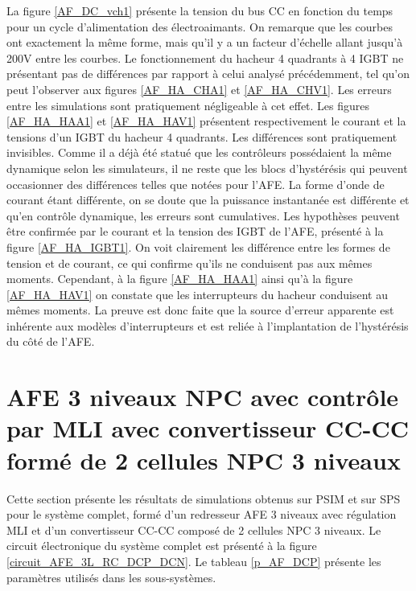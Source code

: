 La figure \ref{AF_DC_vch1} présente la tension du bus CC en fonction du temps pour un cycle d'alimentation des électroaimants. On remarque que les courbes ont exactement la même forme, mais qu'il y a un facteur d'échelle allant jusqu'à 200V entre les courbes. Le fonctionnement du hacheur 4 quadrants à 4 IGBT ne présentant pas de différences par rapport à celui analysé précédemment, tel qu'on peut l'observer aux figures \ref{AF_HA_CHA1} et \ref{AF_HA_CHV1}. Les erreurs entre les simulations sont pratiquement négligeable à cet effet. Les figures \ref{AF_HA_HAA1} et \ref{AF_HA_HAV1} présentent respectivement le courant et la tensions d'un IGBT du hacheur 4 quadrants. Les différences sont pratiquement invisibles. Comme il a déjà été statué que les contrôleurs possédaient la même dynamique selon les simulateurs, il ne reste que les blocs d'hystérésis qui peuvent occasionner des différences telles que notées pour l'AFE. La forme d'onde de courant étant différente, on se doute que la puissance instantanée est différente et qu'en contrôle dynamique, les erreurs sont cumulatives. Les hypothèses peuvent être confirmée par le courant et la tension des IGBT de l'AFE, présenté à la figure \ref{AF_HA_IGBT1}. On voit clairement les différence entre les formes de tension et de courant, ce qui confirme qu'ils ne conduisent pas aux mêmes moments. Cependant, à la figure \ref{AF_HA_HAA1} ainsi qu'à la figure \ref{AF_HA_HAV1} on constate que les interrupteurs du hacheur conduisent au mêmes moments. La preuve est donc faite que la source d'erreur apparente est inhérente aux modèles d'interrupteurs et est reliée à l'implantation de l'hystérésis du côté de l'AFE. 

\section{AFE 3 niveaux NPC avec contrôle par MLI avec convertisseur CC-CC formé de 2 cellules NPC 3 niveaux}
Cette section présente les résultats de simulations obtenus sur PSIM et sur SPS pour le système complet, formé d'un redresseur AFE 3 niveaux avec régulation MLI et d'un convertisseur CC-CC composé de 2 cellules NPC 3 niveaux.  Le circuit électronique du système complet est présenté à la figure \ref{circuit_AFE_3L_RC_DCP_DCN}. Le tableau \ref{p_AF_DCP} présente les paramètres utilisés dans les sous-systèmes.

